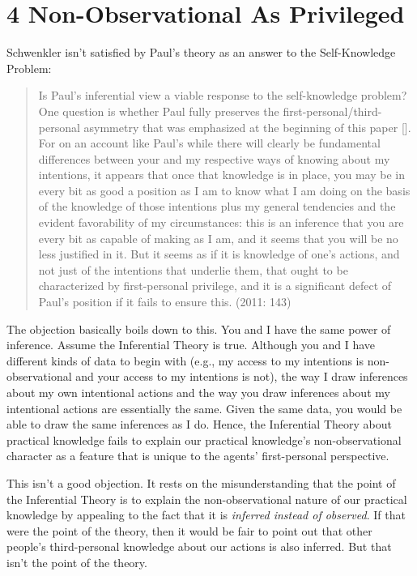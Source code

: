 \documentclass[a4paper,12pt]{article}
\begin{document}
\section*{4 Non-Observational As Privileged}
Schwenkler isn't satisfied by Paul's theory as an answer to the Self-Knowledge Problem:

\begin{quote} Is Paul's inferential view a viable response to the self-knowledge problem? One question is whether Paul fully preserves the first-personal/third-personal asymmetry that was emphasized at the beginning of this paper [\textellipsis]. For on an account like Paul's while there will clearly be fundamental differences between your and my respective ways of knowing about my intentions, it appears that once that knowledge is in place, you may be in every bit as good a position as I am to know what I am doing on the basis of the knowledge of those intentions plus my general tendencies and the evident favorability of my circumstances: this is an inference that you are every bit as capable of making as I am, and it seems that you will be no less justified in it. But it seems as if it is knowledge of one's actions, and not just of the intentions that underlie them, that ought to be characterized by first-personal privilege, and it is a significant defect of Paul's position if it fails to ensure this. (2011: 143) \end{quote}

The objection basically boils down to this. You and I have the same power of inference. Assume the Inferential Theory is true. Although you and I have different kinds of data to begin with (e.g., my access to my intentions is non-observational and your access to my intentions is not), the way I draw inferences about my own intentional actions and the way you draw inferences about my intentional actions are essentially the same. Given the same data, you would be able to draw the same inferences as I do. Hence, the Inferential Theory about practical knowledge fails to explain our practical knowledge's non-observational character as a feature that is unique to the agents' first-personal perspective.

This isn't a good objection. It rests on the misunderstanding that the point of the Inferential Theory is to explain the non-observational nature of our practical knowledge by appealing to the fact that it is \emph{inferred instead of observed}. If that were the point of the theory, then it would be fair to point out that other people's third-personal knowledge about our actions is also inferred. But that isn't the point of the theory.
\end{document}
